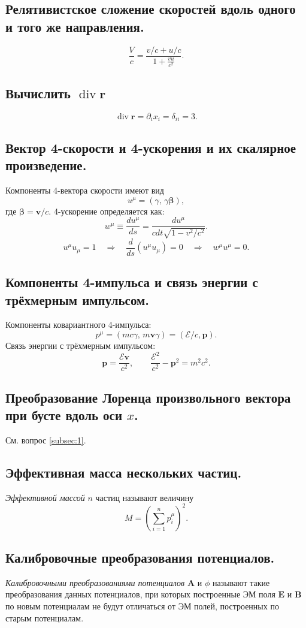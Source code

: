 \documentclass[a4paper,12pt]{article}
\begin{document}
\subsection{Релятивистское сложение скоростей вдоль одного и того же
направления.}
\[
\frac{V}{c}=\frac{v /c +u /c}{1+\frac{vu}{c^2}}
.\] 
\subsection{Вычислить $\operatorname{div} \mathbf{r}$}
\[
	\operatorname{div} \mathbf{r}=\partial_i x_i=\delta_{ii}=3
.\] 
\subsection{Вектор 4-скорости и 4-ускорения и их скалярное произведение.}
Компоненты 4-вектора скорости имеют вид
\[
	u^\mu=\left( \gamma,\,\gamma \boldsymbol{\beta} \right) 
,\] 
где $\boldsymbol{\beta}=\mathbf{v} /c$.
4-ускорение определяется как:
\[
w^\mu\equiv \frac{du^\mu}{ds}= \frac{du^\mu}{cdt\sqrt{1-v^2 /c^2} }
.\]
\[
	u^\mu u_\mu=1 \quad \Rightarrow \quad \frac{d}{ds}\left( u^\mu u_\mu \right) =0
	\quad \Rightarrow \quad w^\mu u^\mu=0
.\] 
\subsection{Компоненты 4-импульса и связь энергии с трёхмерным импульсом.}
Компоненты ковариантного 4-импульса:
\[
	p^\mu=\left( mc\gamma,\,m\mathbf{v}\gamma \right) =\left( \mathcal{E} /c,
	\mathbf{p}\right) 
.\]
Связь энергии с трёхмерным импульсом:
\[
	\mathbf{p}=\frac{\mathcal{E}\mathbf{v}}{c^2}, \qquad
	\frac{\mathcal{E}^2}{c^2}-\mathbf{p}^2=m^2c^2
.\] 
\subsection{Преобразование Лоренца произвольного вектора при бусте вдоль оси
$x$.}
См. вопрос \ref{subsec:1}.
\subsection{Эффективная масса нескольких частиц.}
\begin{dfn}
	\emph{Эффективной массой} $n$ частиц называют величину
	\[
		M=\left( \sum_{i=1}^{n} p^\mu_i \right)^2 
	.\] 
\end{dfn}
\subsection{Калибровочные преобразования потенциалов.}
\begin{dfn}
	\emph{Калибровочными преобразованиями потенциалов}  $\mathbf{A}$ и
	$\phi$ называют такие преобразования данных потенциалов, при которых
	построенные ЭМ поля $\mathbf{E}$ и $\mathbf{B}$ по новым потенциалам
	не будут отличаться от ЭМ полей, построенных по старым потенциалам.
\end{dfn}
\end{document}
